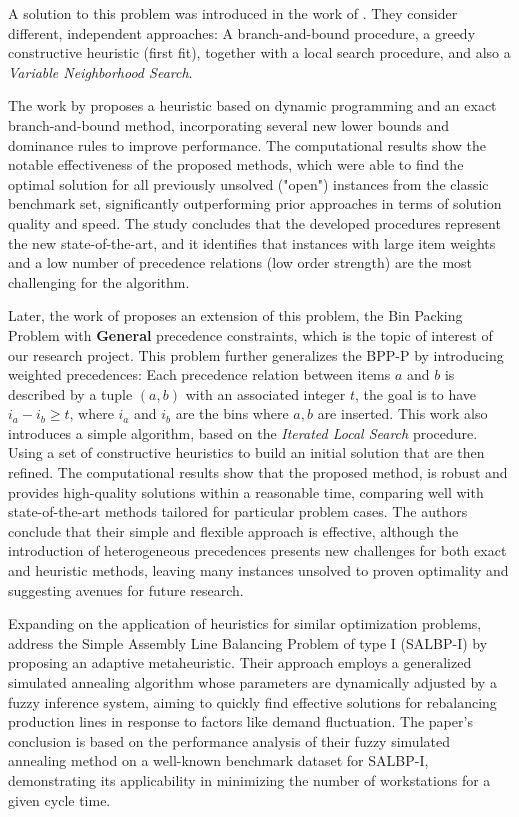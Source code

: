 \documentclass[12pt]{article}
\begin{document}
 A solution to this problem was introduced in the work of \cite{dell2012bin}. They consider different, independent approaches: A branch-and-bound procedure, a greedy constructive heuristic (first fit), together with a local search procedure, and also a \textit{Variable Neighborhood Search}.

The work by \cite{pereira:16} proposes a heuristic based on dynamic 
programming and an exact branch-and-bound method, incorporating several new lower bounds and dominance
rules to improve performance. The computational results show the notable effectiveness of the 
proposed methods, which were able to find the optimal solution for all previously unsolved ("open") 
instances from the classic benchmark set, significantly outperforming prior approaches in terms of 
solution quality and speed. The study concludes that the developed procedures represent the new 
state-of-the-art, and it identifies that instances with large item weights and a low number of 
precedence relations (low order strength) are the most challenging for the algorithm.

Later, the work of \cite{kramer:17} proposes an extension of this problem, the Bin Packing Problem with \textbf{General} precedence constraints, which is the topic of interest of our research project. This problem further generalizes the BPP-P by introducing weighted precedences: Each precedence relation between items \(a\) and \(b\) is described by a tuple \((a, b)\) with an associated integer \(t\), the goal is to have \(i_a - i_b \geq t\), where \(i_a\) and \(i_b\) are the bins where \(a, b\) are inserted. This work also introduces a simple algorithm, based on the \textit{Iterated Local Search} procedure. Using a set of constructive heuristics to build an initial solution that are then refined. The computational results show that the proposed method, is robust and provides high-quality solutions within a 
reasonable time, comparing well with state-of-the-art methods tailored for particular problem cases. The authors conclude that their simple and flexible approach is effective, although the introduction
of heterogeneous precedences presents new challenges for both exact and heuristic methods, 
leaving many instances unsolved to proven optimality and suggesting avenues for future research.

Expanding on the application of heuristics for similar optimization problems, \cite{lalaoui:18} address 
the Simple Assembly Line Balancing Problem of type I (SALBP-I) by proposing an adaptive metaheuristic. 
Their approach employs a generalized simulated annealing algorithm whose parameters are dynamically 
adjusted by a fuzzy inference system, aiming to quickly find effective solutions for rebalancing 
production lines in response to factors like demand fluctuation. The paper's conclusion is based on 
the performance analysis of their fuzzy simulated annealing method on a well-known benchmark dataset 
for SALBP-I, demonstrating its applicability in minimizing the number of workstations for a given 
cycle time.
\end{document}

